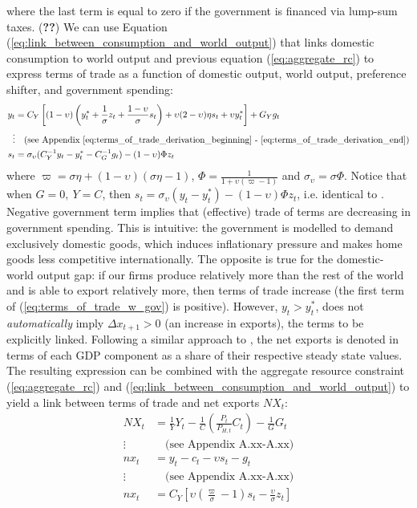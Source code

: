where the last term is equal to zero if the government is financed via lump-sum taxes. (\textbf{??}) We can use Equation (\ref{eq:link_between_consumption_and_world_output}) that links domestic consumption to world output and previous equation (\ref{eq:aggregate_rc}) to express terms of trade as a function of domestic output, world output, preference shifter, and government spending:
\begin{align}
    y_t &= C_Y\left[(1-\upsilon)\left( y^*_t + \frac{1}{\sigma}z_t + \frac{1-\upsilon}{\sigma}s_t \right) + \upsilon (2-\upsilon)\eta s_t + \upsilon y^*_t\right] + G_Y g_t \\
    \vdots & \quad \text{(see Appendix \ref{eq:terms_of_trade_derivation_beginning} - \ref{eq:terms_of_trade_derivation_end})} \nonumber \\
    s_t &= \sigma_\upsilon(C_Y^{-1} y_t - y^*_t - C_G^{-1} g_t) - (1-\upsilon)\Phi z_t \label{eq:terms_of_trade_w_gov}
\end{align}
where $\varpi = \sigma \eta + (1-\upsilon)(\sigma \eta - 1)$, $\Phi = \frac{1}{1 + \upsilon (\varpi - 1)}$ and $\sigma_\upsilon = \sigma \Phi$. Notice that when $G=0,\ Y=C$, then $s_t = \sigma_\upsilon(y_t - y^*_t) - (1-\upsilon)\Phi z_t$, i.e. identical to \textcite{jordigal_2015_monetary}. Negative government term implies that (effective) trade of terms are decreasing in government spending. This is intuitive: the government is modelled to demand exclusively domestic goods, which induces inflationary pressure and makes home goods less competitive internationally. The opposite is true for the domestic-world output gap: if our firms produce relatively more than the rest of the world and is able to export relatively more, then terms of trade increase (the first term of (\ref{eq:terms_of_trade_w_gov}) is positive). However, $y_t > y^*_t$, does not \textit{automatically} imply $\Delta x_{t+1} > 0$ (an increase in exports), the terms to be explicitly linked. Following a similar approach to \textcite{jordigal_2015_monetary}, the net exports is denoted in terms of each GDP component as a share of their respective steady state values. The resulting expression can be combined with the aggregate resource constraint (\ref{eq:aggregate_rc}) and (\ref{eq:link_between_consumption_and_world_output}) to yield a link between terms of trade and net exports $NX_t$:
\begin{align}
    NX_t &= \frac{1}{Y} Y_t - \frac{1}{C}\left(\frac{P_t}{P_{H,t}}C_t\right) - \frac{1}{G}G_t \\
    \vdots & \quad \text{(see Appendix A.xx-A.xx)} \nonumber \\
    nx_t &= y_t - c_t - \upsilon s_t - g_t \label{eq:trade_balance_w_consumption} \\
    \vdots & \quad \text{(see Appendix A.xx-A.xx)} \nonumber \\
    nx_t&=C_Y\left[\upsilon \left(\frac{\varpi}{\sigma} - 1\right) s_t - \frac{\upsilon}{\sigma}z_t \right] \label{eq:trade_balance_wout_consumption}
\end{align}
